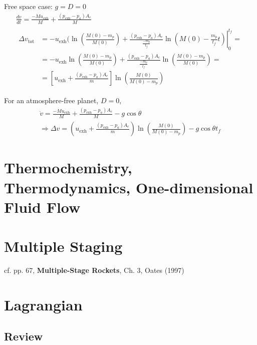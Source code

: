 \documentclass[10pt]{amsart}
\begin{document}
\begin{multicols*}{2}
Free space case: $g=D=0$ 
\[
\begin{gathered}
\frac{dv}{dt} = \frac{- \dot{M} u_{\text{exh} } }{ M }  + \frac{(p_{\text{exh} } - p_a ) A_e }{M} \\ \begin{aligned}
  \Delta v_{\text{tot}} & = -u_{\text{exh}} ( \ln{ \left( \frac{M(0) - m_p }{M(0) } \right) } + \left. \frac{ (p_{\text{exh}} - p_a)A_e }{ \frac{-m_p}{t_f} } \ln{ \left( M(0) - \frac{m_p}{t_f} t \right) } \right|_0^{t_f} = \\
  & = -u_{\text{exh}} \ln{ \left( \frac{M(0) - m_p }{M(0) } \right) } + \frac{ (p_{\text{exh} } - p_a )A_e }{ \frac{-m_p}{t_f} } \ln{ \left( \frac{M(0) - m_p }{ M(0) } \right) } =  \\
  & = \left[ u_{\text{exh}} + \frac{ (p_{\text{exh}} - p_a )A_e }{\dot{m}} \right] \ln{ \left( \frac{M(0)}{ M(0) - m_p } \right) }
\end{aligned}
\end{gathered}
\]

For an atmosphere-free planet, $D=0$, 
\[
\begin{gathered}
  \dot{v} = \frac{-\dot{M} u_{\text{exh} } }{M} + \frac{ (p_{\text{exh}} - p_a )A_e }{ M} - g\cos{\theta} \\
  \Longrightarrow \Delta v= \left( u_{\text{exh}} + \frac{ (p_{\text{exh}} - p_a ) A_e }{\dot{m}} \right) \ln{ \left( \frac{M(0) }{ M(0) - m_p } \right) } - g\cos{\theta}t_f
\end{gathered}
\]

\section{Thermochemistry, Thermodynamics, One-dimensional Fluid Flow}






\section{Multiple Staging}

cf. pp. 67, \textbf{Multiple-Stage Rockets}, Ch. 3, Oates (1997) \cite{GOates1997}

\section{Lagrangian}

\subsection{Review}





\end{multicols*}
\end{document}
